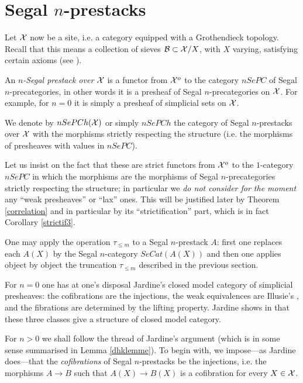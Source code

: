 
\clearpage
\section{Segal \texorpdfstring{$n$}{n}-prestacks}
\label{nchampsegpage}

Let ${\cal X}$ now be a site, i.e. a category equipped with a Grothendieck topology.
Recall that this means a collection of sieves ${\cal B}
\subset {\cal X} /X$, with $X$ varying, satisfying certain axioms
(see \cite{SGA4} \cite{MacLaneMoerdijk} \cite{Rezk}).


An {\em $n$-Segal prestack over ${\cal X}$} is a functor from
${\cal X} ^o$ to the category $nSePC$ of Segal $n$-precategories, in other words
it is a presheaf of Segal $n$-precategories on ${\cal X}$. For example, for
$n=0$ it is simply a
presheaf of simplicial sets on ${\cal X}$.

We denote by $nSePCh({\cal X} )$ or simply $nSePCh$ the category of
Segal $n$-prestacks over ${\cal X}$ with the morphisms strictly respecting the
structure (i.e. the morphisms of presheaves with values in
$nSePC$).

Let us insist on the fact that these are strict functors from ${\cal X} ^o$ to
the $1$-category $nSePC$ in which the morphisms are the morphisms of
Segal $n$-precategories strictly respecting the structure; in particular
we {\em
do not consider for the moment} any ``weak presheaves'' or
``lax'' ones.
This will be justified later by Theorem \ref{correlation}
and in
particular by its ``strictification'' part, which is in fact Corollary
\ref{strictif3}.

One may apply the operation $\tau _{\leq m}$ to a Segal $n$-prestack
$A$:
first
one replaces each $A(X)$ by the Segal $n$-category $SeCat(A(X))$ and
then one applies object by object the truncation $\tau _{\leq m}$ described
in the previous section.


For $n=0$ one has at one's disposal Jardine's closed model category \cite{Jardine}
of simplicial presheaves: the cofibrations are the
injections, the weak equivalences are Illusie's \cite{Illusie},
and the fibrations are determined by the lifting property.
Jardine shows in \cite{Jardine} that these three classes give a
structure of
closed model category.



For $n>0$ we shall
follow the thread of Jardine's argument \cite{Jardine} (which is in some sense
summarised in Lemma \ref{dhklemme}).
To begin with, we impose---as Jardine does---that the {\em cofibrations} of
Segal $n$-prestacks be the injections,
i.e. the morphisms $A\rightarrow B$ such that $A(X)\rightarrow B(X)$ is a
cofibration for every $X\in {\cal X}$.

